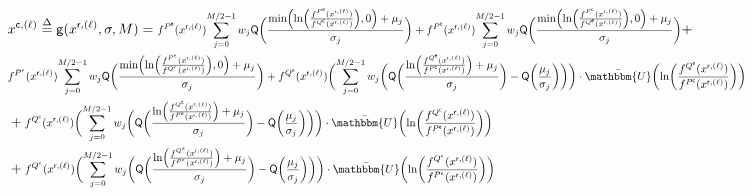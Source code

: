 \documentclass[journal]{IEEEtran}
\newcommand{\mep}{{x}}
\newcommand{\row}{\mathsf{r}}
\newcommand{\col}{\mathsf{c}}
\newcommand{\Q}{\mathsf{Q}}
\newcommand{\Pue}{P^{\mathsf{e}}}
\newcommand{\Que}{Q^{\mathsf{e}}}
\newcommand{\Puc}{P^{\mathsf{c}}}
\newcommand{\Quc}{Q^{\mathsf{c}}}
\newcommand{\Puep}{P^{\mathsf{\epsilon}}}
\newcommand{\Quep}{Q^{\mathsf{\epsilon}}}
\let\originalleft\left
\let\originalright\right
\renewcommand{\left}{\mathopen{}\mathclose\bgroup\originalleft}
\renewcommand{\right}{\aftergroup\egroup\originalright}
\newcommand\scalemath[2]{\scalebox{#1}{\mbox{\ensuremath{\displaystyle #2}}}}   %
\begin{document}
\begin{figure*}[t]
	\vspace*{-20pt}
	\hrulefill		
	\begin{align}\label{QAMxcl}
	& \nonumber \mep^{\col,(\ell)} \buildrel \Delta \over = \mathsf{g}(\mep^{\row,(\ell)}, \sigma, M) = \scalemath{0.8}{f^{\Pue}(\mep^{\row,(\ell)}){\sum\limits_{j = 0}^{M/2 - 1} {w_j} {\Q\biggl( \frac{{ \text{min}\left(\ln \left( \frac{f^{\Pue}(\mep^{\row,(\ell)})}{f^{\Quc}(\mep^{\row,(\ell)})}\right),0\right)+\mu_{j}}}{\sigma_{j}} \biggr) } } + f^{\Puc}(\mep^{\row,(\ell)}){\sum\limits_{j = 0}^{M/2 - 1} {w_j} {\Q\biggl( \frac{{ \text{min}\left(\ln \left( \frac{f^{\Puc}(\mep^{\row,(\ell)})}{f^{\Que}(\mep^{\row,(\ell)})}\right),0\right)+\mu_{j}}}{\sigma_{j}} \biggr) } }} + \\ \nonumber &  \scalemath{0.8}{f^{\Puep}(\mep^{\row,(\ell)}){\sum\limits_{j = 0}^{M/2 - 1} {w_j} {\Q\biggl( \frac{{ \text{min}\left(\ln \left( \frac{f^{\Puep}(\mep^{\row,(\ell)})}{f^{\Quep}(\mep^{\row,(\ell)})}\right),0\right)+\mu_{j}}}{\sigma_{j}} \biggr) } } + f^{\Que}(\mep^{\row,(\ell)})\biggl( {\sum\limits_{j = 0}^{M/2 - 1} {w_j} \biggl( {\Q\biggl( \frac{{ \ln \left( \frac{f^{\Que}(\mep^{\row,(\ell)})}{f^{\Puc}(\mep^{\row,(\ell)})}\right)+\mu_{j}}}{\sigma_{j}} \biggr) } - \Q\left(\frac{\mu_{j}}{\sigma_{j}} \right) \biggr) } \biggr) \cdot \bar{\mathbbm{U}} \left( \ln \left(\frac{f^{\Que}(\mep^{\row,(\ell)})}{f^{\Puc}(\mep^{\row,(\ell)})}\right) \right)} \\ \nonumber & + \scalemath{0.8}{f^{\Quc}(\mep^{\row,(\ell)})\biggl( {\sum\limits_{j = 0}^{M/2 - 1} {w_j} \biggl( {\Q\biggl( \frac{{ \ln \left( \frac{f^{\Quc}(\mep^{\row,(\ell)})}{f^{\Pue}(\mep^{\row,(\ell)})}\right)+\mu_{j}}}{\sigma_{j}} \biggr) } - \Q\left(\frac{\mu_{j}}{\sigma_{j}} \right) \biggr) } \biggr) \cdot \bar{\mathbbm{U}} \left( \ln \left(\frac{f^{\Quc}(\mep^{\row,(\ell)})}{f^{\Pue}(\mep^{\row,(\ell)})}\right) \right)} \\  & + \scalemath{0.8}{f^{\Quep}(\mep^{\row,(\ell)})\biggl( {\sum\limits_{j = 0}^{M/2 - 1} {w_j} \biggl( {\Q\biggl( \frac{{ \ln \left( \frac{f^{\Quep}(\mep^{\row,(\ell)})}{f^{\Puep}(\mep^{\row,(\ell)})}\right)+\mu_{j}}}{\sigma_{j}} \biggr) } - \Q\left(\frac{\mu_{j}}{\sigma_{j}} \right) \biggr) } \biggr) \cdot \bar{\mathbbm{U}} \left( \ln \left(\frac{f^{\Quep}(\mep^{\row,(\ell)})}{f^{\Puep}(\mep^{\row,(\ell)})}\right) \right)}
	\end{align}
	\hrulefill
\end{figure*} 
\end{document}
